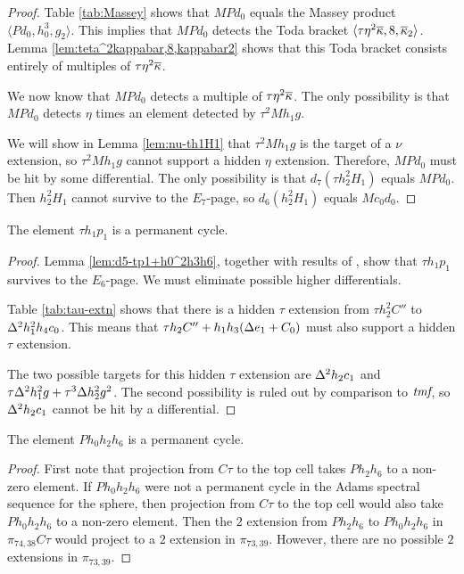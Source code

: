 \begin{proof}
Table \ref{tab:Massey} shows that 
$M P d_0$ equals the Massey product $\langle P d_0, h_0^3, g_2 \rangle$.
This implies that
$M P d_0$ detects the
Toda bracket $\langle \tau \eta^2 \overline{\kappa}, 8, \overline{\kappa}_2 \rangle$.
Lemma \ref{lem:teta^2kappabar,8,kappabar2} shows that this
Toda bracket consists entirely of multiples of
$\tau \eta^2 \overline{\kappa}$.

We now know that $M P d_0$ detects a multiple of 
$\tau \eta^2 \overline{\kappa}$.
The only possibility is that 
$M P d_0$ detects $\eta$ times an element detected by
$\tau^2 M h_1 g$.

We will show in Lemma \ref{lem:nu-th1H1}
that $\tau^2 M h_1 g$ is the target of a $\nu$ extension,
so $\tau^2 M h_1 g$ cannot support a hidden $\eta$ extension.
Therefore, $M P d_0$ must be hit by some differential.
The only possibility is that 
$d_7(\tau h_2^2 H_1)$ equals $M P d_0$.
Then $h_2^2 H_1$ cannot survive to the $E_7$-page,
so $d_6(h_2^2 H_1)$ equals $M c_0 d_0$.
\end{proof}

\begin{lemma}
\label{lem:perm-th1p1}
The element $\tau h_1 p_1$ is a permanent cycle.
\end{lemma}

\begin{proof}
Lemma \ref{lem:d5-tp1+h0^2h3h6}, together with results of
\cite{BIX}, show that $\tau h_1 p_1$ survives to the $E_6$-page.
We must eliminate possible higher differentials.

Table \ref{tab:tau-extn} shows that there is a hidden
$\tau$ extension from $\tau h_2^2 C''$ to $\Delta^2 h_1^2 h_4 c_0$.
This means that $\tau h_2 C'' + h_1 h_3(\Delta e_1 + C_0)$ must 
also support a hidden $\tau$ extension.

The two possible targets for this hidden $\tau$ extension
are $\Delta^2 h_2 c_1$ and $\tau \Delta^2 h_1^2 g + \tau^3 \Delta h_2^2 g^2$.
The second possibility is ruled out by comparison to $\textit{tmf}$, so
$\Delta^2 h_2 c_1$ cannot be hit by a differential.
\end{proof}

\begin{lemma}
\label{lem:perm-Ph0h2h6}
The element $P h_0 h_2 h_6$ is a permanent cycle.
\end{lemma}

\begin{proof}
First note that projection from $C\tau$ to the top cell
takes $P h_2 h_6$ to a non-zero element.
If $P h_0 h_2 h_6$ were not a permanent cycle in the
Adams spectral sequence for the sphere,
then projection from $C\tau$ to the top cell would
also take $P h_0 h_2 h_6$ to a non-zero element.
Then the $2$ extension from $P h_2 h_6$ to $P h_0 h_2 h_6$
in $\pi_{74,38} C\tau$ would project to a $2$ extension
in $\pi_{73,39}$.  However, there are no possible
$2$ extensions in $\pi_{73,39}$.
\end{proof}

